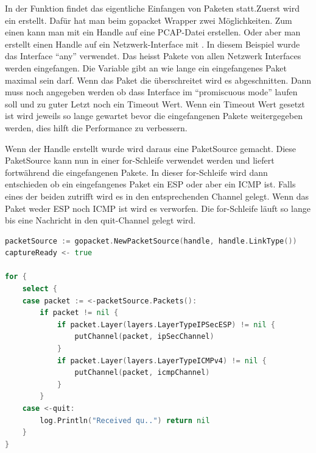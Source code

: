 In der  Funktion findet das eigentliche Einfangen von Paketen statt.Zuerst wird ein  erstellt. Dafür hat man beim gopacket Wrapper zwei Möglichkeiten. Zum einen kann man mit  ein Handle auf eine \ac{PCAP}-Datei erstellen. Oder aber man erstellt einen Handle auf ein Netzwerk-Interface mit . In diesem Beispiel wurde das Interface \enquote{any} verwendet. Das heisst Pakete von allen Netzwerk Interfaces werden eingefangen. Die  Variable gibt an wie lange ein eingefangenes Paket maximal sein darf. Wenn das Paket die  überschreitet wird es abgeschnitten. Dann muss noch angegeben werden ob dass Interface im \enquote{promiscuous mode} laufen soll und zu guter Letzt noch ein Timeout Wert. Wenn ein Timeout Wert gesetzt ist wird jeweils so lange gewartet bevor die eingefangenen Pakete weitergegeben werden, dies hilft die Performance zu verbessern.

Wenn der Handle erstellt wurde wird daraus eine PaketSource gemacht. Diese PaketSource kann nun in einer for-Schleife verwendet werden und liefert fortwährend die eingefangenen Pakete. In dieser for-Schleife wird dann entschieden ob ein eingefangenes Paket ein \ac{ESP} oder aber ein \ac{ICMP} ist. Falls eines der beiden zutrifft wird es in den entsprechenden Channel gelegt. Wenn das Paket weder \ac{ESP} noch \ac{ICMP} ist wird es verworfen. Die for-Schleife läuft so lange bis eine Nachricht in den quit-Channel gelegt wird.

\begin{lstlisting}[language=go, caption=Einfangen und Verteilen von Paketen]    
packetSource := gopacket.NewPacketSource(handle, handle.LinkType())
captureReady <- true

for {
	select {
	case packet := <-packetSource.Packets():
		if packet != nil {
			if packet.Layer(layers.LayerTypeIPSecESP) != nil {
				putChannel(packet, ipSecChannel)
			}
			if packet.Layer(layers.LayerTypeICMPv4) != nil {
				putChannel(packet, icmpChannel)
			}
		}
	case <-quit:
		log.Println("Received qu..") return nil
	}
}
\end{lstlisting}


